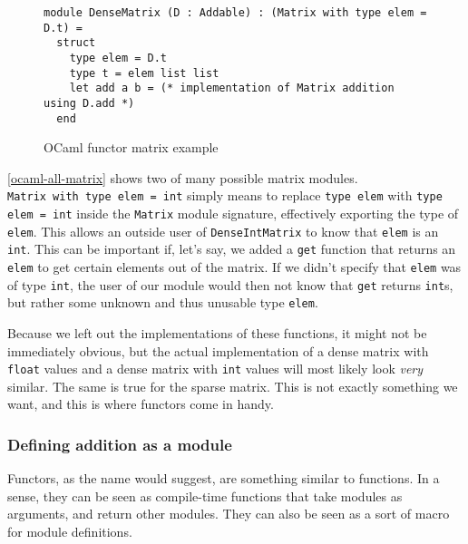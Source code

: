 \begin{figure*}
\begin{verbatim}
module DenseMatrix (D : Addable) : (Matrix with type elem = D.t) =
  struct
    type elem = D.t
    type t = elem list list
    let add a b = (* implementation of Matrix addition using D.add *)
  end
\end{verbatim}
\caption{OCaml functor matrix example}
\label{ocaml-matrix-functor}
\end{figure*}

\autoref{ocaml-all-matrix} shows two of many possible matrix modules. \\ \verb|Matrix with type elem = int| simply means to replace \verb|type elem| with \verb|type elem = int| inside the \verb|Matrix| module signature, effectively exporting the type of \verb|elem|. This allows an outside user of \verb|DenseIntMatrix| to know that \verb|elem| is an \verb|int|. This can be important if, let's say, we added a \verb|get| function that returns an \verb|elem| to get certain elements out of the matrix. If we didn't specify that \verb|elem| was of type \verb|int|, the user of our module would then not know that \verb|get| returns \verb|int|s, but rather some unknown and thus unusable type \verb|elem|.

Because we left out the implementations of these functions, it might not be immediately obvious, but the actual implementation of a dense matrix with \verb|float| values and a dense matrix with \verb|int| values will most likely look \textit{very} similar. The same is true for the sparse matrix. This is not exactly something we want, and this is where functors come in handy.

\subsubsection{Defining addition as a module}

Functors, as the name would suggest, are something similar to functions. In a sense, they can be seen as compile-time functions that take modules as arguments, and return other modules. They can also be seen as a sort of macro for module definitions.

